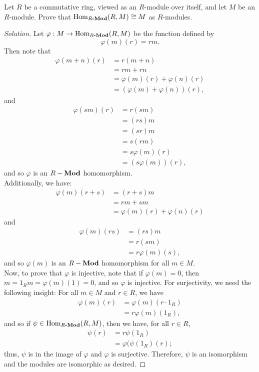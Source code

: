 \documentclass[12pt]{article}
\newenvironment{problem}[2][Problem]{\begin{trivlist}
\item[\hskip \labelsep {\bfseries #1}\hskip \labelsep {\bfseries #2.}]}{\end{trivlist}}
\newcommand{\catname}[1]{\normalfont\textbf{#1}}
\newcommand{\Hom}{\text{Hom}}
\newcommand{\Homod}[2]{\Hom_{#1\catname{-Mod}}(#2)}
\newenvironment{solution}
  {\renewcommand\qedsymbol{$\blacksquare$}\begin{proof}[Solution]}
{\end{proof}}
\theoremstyle{remark}
\begin{document}
\begin{problem}{5.5}
  Let $R$ be a commutative ring, viewed as an $R$-module over itself,
  and let $M$ be an $R$-module.
  Prove that $\Homod{R}{R,M}\cong M$ as $R$-modules.
\end{problem}
\begin{solution}
  Let $\varphi : M\to \Homod{R}{R,M}$ be the function defined by $$\varphi(m)(r)=rm.$$
  Then note that
  \begin{align*}
    \varphi(m+n)(r) &= r(m+n) \\
    &= rm + rn \\
    &= \varphi(m)(r) + \varphi(n)(r) \\
    &= (\varphi(m)+\varphi(n))(r),
  \end{align*}
  and 
  \begin{align*}
    \varphi(sm)(r) &= r(sm) \\
    &= (rs)m \\
    &= (sr)m \\
    &= s(rm) \\
    &= s\varphi(m)(r) \\
    &= (s\varphi(m))(r),
  \end{align*}
  and so $\varphi$ is an $R-\catname{Mod}$ homomorphism. \\
  Additionally, we have:
  \begin{align*}
    \varphi(m)(r+s) &= (r+s)m \\
    &= rm+sm \\
    &= \varphi(m)(r) + \varphi(n)(r)
  \end{align*}
  and 
  \begin{align*}
    \varphi(m)(rs) &= (rs)m \\
    &= r(sm) \\
    &= r\varphi(m)(s),
  \end{align*}
  and so $\varphi(m)$ is an $R-\catname{Mod}$ homomorphism for all $m\in M$. \\
  \indent Now, to prove that $\varphi$ is injective, note that if $\varphi(m) = 0$,
  then $m = 1_Rm = \varphi(m)(1) = 0$, and so $\varphi$ is injective.
  For surjectivity, we need the following insight: 
  For all $m\in M$ and $r\in R$, we have
  \begin{align*}
    \varphi(m)(r) &= \varphi(m)(r\cdot1_R) \\
    &=r\varphi(m)(1_R),
  \end{align*}
  and so if $\psi\in\Homod{R}{R,M}$, then we have, for all $r\in R$,
  \begin{align*}
    \psi(r) &= r\psi(1_R)\\
    &= \varphi(\psi(1_R)(r);
  \end{align*}
  thus, $\psi$ is in the image of $\varphi$ and $\varphi$ is surjective.
  Therefore, $\psi$ is an isomorphism and the modules are isomorphic as desired.
\end{solution}
\end{document}
